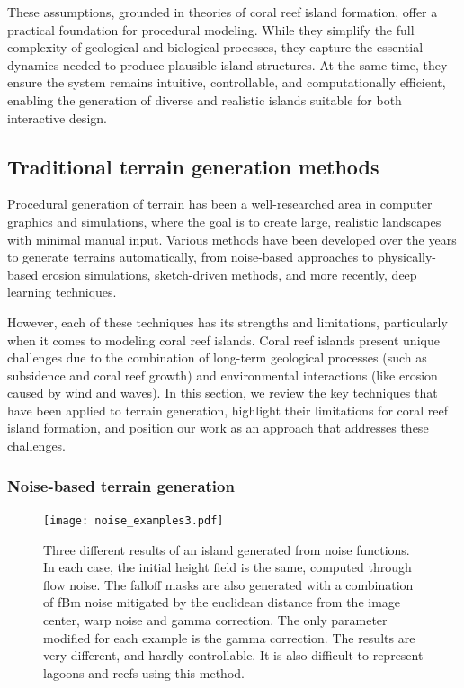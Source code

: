 These assumptions, grounded in theories of coral reef island formation, offer a practical foundation for procedural modeling. While they simplify the full complexity of geological and biological processes, they capture the essential dynamics needed to produce plausible island structures. At the same time, they ensure the system remains intuitive, controllable, and computationally efficient, enabling the generation of diverse and realistic islands suitable for both interactive design.





\subsection{Traditional terrain generation methods}
\label{sec:coral-island-sota-traditional}

Procedural generation of terrain has been a well-researched area in computer graphics and simulations, where the goal is to create large, realistic landscapes with minimal manual input. Various methods have been developed over the years to generate terrains automatically, from noise-based approaches to physically-based erosion simulations, sketch-driven methods, and more recently, deep learning techniques.

However, each of these techniques has its strengths and limitations, particularly when it comes to modeling coral reef islands. Coral reef islands present unique challenges due to the combination of long-term geological processes (such as subsidence and coral reef growth) and environmental interactions (like erosion caused by wind and waves). In this section, we review the key techniques that have been applied to terrain generation, highlight their limitations for coral reef island formation, and position our work as an approach that addresses these challenges.


\subsubsection{Noise-based terrain generation}

\begin{figure}[ht]
    \centering
    \texttt{[image: noise\_examples3.pdf]}
    \caption{Three different results of an island generated from noise functions. In each case, the initial height field is the same, computed through flow noise. The falloff masks are also generated with a combination of fBm noise mitigated by the euclidean distance from the image center, warp noise and gamma correction. The only parameter modified for each example is the gamma correction. The results are very different, and hardly controllable. It is also difficult to represent lagoons and reefs using this method.}
    \label{fig:coral-island-noise-example}
\end{figure}

